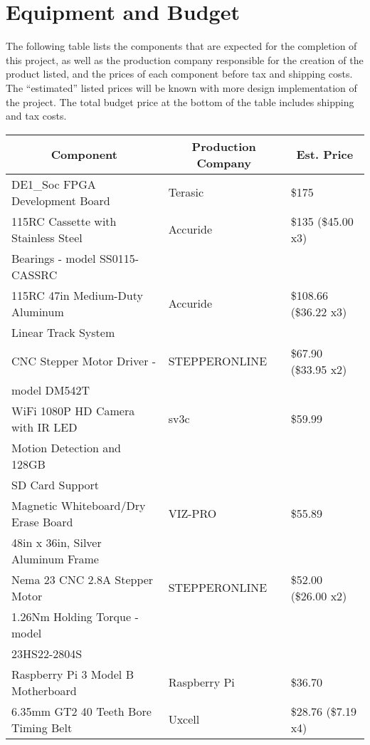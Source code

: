 \section{Equipment and Budget}
The following table lists the components that are expected for the completion of this project, as well as the production company responsible for the creation of the product listed, and the prices of each component before tax and shipping costs. The ``estimated'' listed prices will be known with more design implementation of the project. The total budget price at the bottom of the table includes shipping and tax costs.
\setlength{\parindent}{5ex}
\begin{table} [H]
	\normalsize
	\centering
	\begin{tabular}{|l|l|l|}
		\hline
		\multicolumn{1}{|c|}{\textbf{Component}}  & 
		\multicolumn{1}{|c|}{\textbf{Production Company}}  & 
		\multicolumn{1}{|c|}{\textbf{Est. Price}} \\
		\hline
		DE1\_Soc FPGA Development Board 	& Terasic 		& \$175 \\
		\hline
		115RC Cassette with Stainless Steel	& Accuride 		& \$135 (\$45.00 x3) \\
		Bearings - model SS0115-CASSRC		&				&	\\
		\hline
		115RC 47in Medium-Duty Aluminum		& Accuride 		& \$108.66 (\$36.22 x3) \\ 
		Linear Track System					&				&	\\
		\hline 		
		CNC Stepper Motor Driver - 		    & STEPPERONLINE & \$67.90 (\$33.95 x2) \\
		model DM542T						&				&	\\
		\hline
		WiFi 1080P HD Camera with IR LED 	& sv3c	 		& \$59.99 \\
		Motion Detection and 128GB			&				&	\\
		SD Card Support						&				&	\\
		\hline
		Magnetic Whiteboard/Dry Erase Board	& VIZ-PRO 		& \$55.89 \\
		48in x 36in, Silver Aluminum Frame	&				&	\\
		\hline
		Nema 23 CNC 2.8A Stepper Motor 		& STEPPERONLINE	& \$52.00 (\$26.00 x2) \\
		1.26Nm Holding Torque - model		&				&	\\
		23HS22-2804S						&				&	\\
		\hline
		Raspberry Pi 3 Model B Motherboard 	& Raspberry Pi	& \$36.70 \\
		\hline
	    6.35mm GT2 40 Teeth Bore Timing Belt& Uxcell 		& \$28.76 (\$7.19 x4) \\

\end{tabular}
\end{table}
